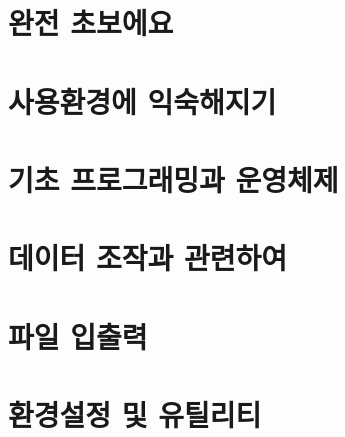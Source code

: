 %
%



\chapter{완전 초보에요}


\chapter{사용환경에 익숙해지기}


\chapter{기초 프로그래밍과 운영체제}


\chapter{데이터 조작과 관련하여}


\chapter{파일 입출력}


\chapter{환경설정 및 유틸리티}

